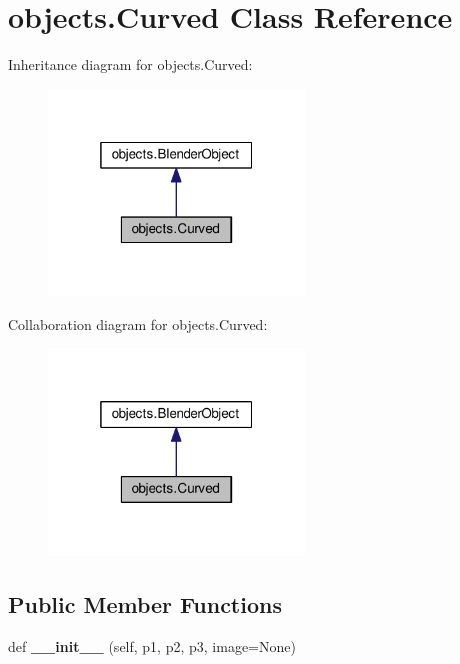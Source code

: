 \hypertarget{classobjects_1_1Curved}{}\section{objects.\+Curved Class Reference}
\label{classobjects_1_1Curved}


Inheritance diagram for objects.\+Curved\+:\nopagebreak
\begin{figure}[H]
\begin{center}
\leavevmode
\includegraphics[width=193pt]{classobjects_1_1Curved__inherit__graph}
\end{center}
\end{figure}


Collaboration diagram for objects.\+Curved\+:\nopagebreak
\begin{figure}[H]
\begin{center}
\leavevmode
\includegraphics[width=193pt]{classobjects_1_1Curved__coll__graph}
\end{center}
\end{figure}
\subsection*{Public Member Functions}
\begin{DoxyCompactItemize}
\item 
def {\bfseries \+\_\+\+\_\+init\+\_\+\+\_\+} (self, p1, p2, p3, image=None)\hypertarget{classobjects_1_1Curved_a7236eb4a34e9120e88e8d8dde62cafef}{}\label{classobjects_1_1Curved_a7236eb4a34e9120e88e8d8dde62cafef}

\end{DoxyCompactItemize}
